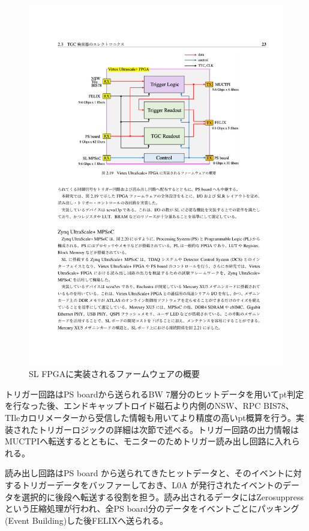 \begin{figure} 
\centering
\includegraphics[width=16cm]{fig/Intro/SL_FW_overview.pdf}
\caption[SL FPGAに実装されるファームウェアの概要]{SL FPGAに実装されるファームウェアの概要\cite{}}
\label{fig_CTA}
\end{figure}

トリガー回路はPS boardから送られるBW 7層分のヒットデータを用いてpt判定を行なった後、エンドキャップトロイド磁石より内側のNSW、RPC BIS78、TIleカロリメーターから受信した情報も用いてより精度の高いpt概算を行う。実装されたトリガーロジックの詳細は次節で述べる。トリガー回路の出力情報はMUCTPIへ転送するとともに、モニターのためトリガー読み出し回路に入れられる。

読み出し回路はPS board から送られてきたヒットデータと、そのイベントに対するトリガーデータをバッファーしておき、L0A が発行されたイベントのデータを選択的に後段へ転送する役割を担う。読み出されるデータにはZerosuppressという圧縮処理が行われ、全PS board分のデータをイベントごとにパッキング(Event Building)した後FELIXへ送られる。

